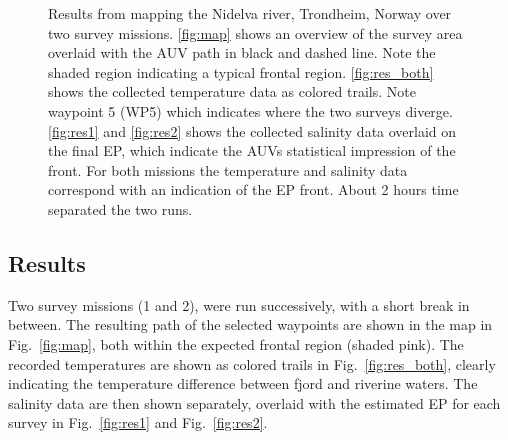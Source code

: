 \documentclass[aoas,preprint]{imsart}
\begin{document}
\begin{figure}[!h]
\hspace{0.2cm}
\caption{Results from mapping the Nidelva river, Trondheim, Norway
  over two survey missions. \ref{fig:map} shows an overview of the
  survey area overlaid with the AUV path in black and dashed
  line. Note the shaded region indicating a typical frontal
  region. \ref{fig:res_both} shows the collected temperature data as
  colored trails. Note waypoint 5 (WP5) which indicates where the two
  surveys diverge. \ref{fig:res1} and \ref{fig:res2} shows the
  collected salinity data overlaid on the final EP, which indicate the
  AUVs statistical impression of the front. For both missions the
  temperature and salinity data correspond with an indication of the
  EP front. About 2 hours time separated the two runs.}
\label{fig:results}
\end{figure}

\subsection{Results}

Two survey missions (1 and 2), were run successively, with a short
break in between. The resulting path of the selected waypoints are
shown in the map in Fig.~\ref{fig:map}, both within the expected
frontal region (shaded pink). The recorded temperatures are shown as
colored trails in Fig.~\ref{fig:res_both}, clearly indicating the
temperature difference between fjord and riverine waters. The salinity
data are then shown separately, overlaid with the estimated EP for
each survey in Fig.~\ref{fig:res1} and Fig.~\ref{fig:res2}.
\end{document}
